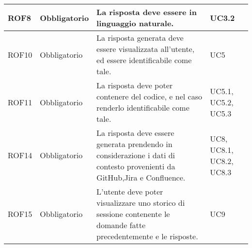 \begin{table}[h!]
\begin{tabularx}{\textwidth}{|p{2cm}|p{3cm}|X|p{4cm}|}
    ROF8 & Obbligatorio & La risposta deve essere in linguaggio naturale. & UC3.2 \\ \hline
    ROF10 & Obbligatorio & La risposta generata deve essere visualizzata all'utente, ed essere identificabile come tale. & UC5 \\ \hline
    ROF11 & Obbligatorio & La risposta deve poter contenere del codice, e nel caso renderlo identificabile come tale. & UC5.1, UC5.2, UC5.3 \\ \hline
    ROF14 & Obbligatorio & La risposta deve essere generata prendendo in considerazione i dati di contesto provenienti da GitHub,Jira e Confluence. & UC8, UC8.1, UC8.2, UC8.3 \\ \hline
    ROF15 & Obbligatorio & L'utente deve poter visualizzare uno storico di sessione contenente le domande fatte precedentemente e le risposte. & UC9 \\ \hline



    \end{tabularx}
    \end{table}

